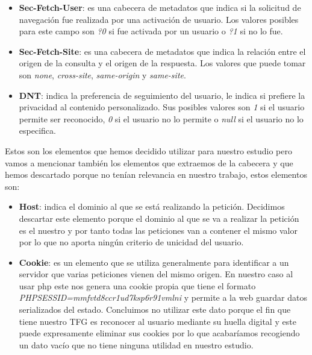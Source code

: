 \begin{itemize}
    \item \textbf{Sec-Fetch-User}: es una cabecera de metadatos que indica si la solicitud de navegación fue realizada por una activación de usuario. Los valores posibles para este campo son \textit{?0} si fue activada por un usuario o \textit{?1} si no lo fue.
    \item \textbf{Sec-Fetch-Site}: es una cabecera de metadatos que indica la relación entre el origen de la consulta y el origen de la respuesta. Los valores que puede tomar son \textit{none}, \textit{cross-site}, \textit{same-origin} y \textit{same-site}.
    \item \textbf{DNT}: indica la preferencia de seguimiento del usuario, le indica si prefiere la privacidad al contenido personalizado. Sus posibles valores son \textit{1} si el usuario permite ser reconocido, \textit{0} si el usuario no lo permite o \textit{null} si el usuario no lo especifica.
\end{itemize}
Estos son los elementos que hemos decidido utilizar para nuestro estudio pero vamos a mencionar también los elementos que extraemos de la cabecera y que hemos descartado porque no tenían relevancia en nuestro trabajo, estos elementos son:
\begin{itemize}
    \item \textbf{Host}: indica el dominio al que se está realizando la petición. Decidimos descartar este elemento porque el dominio al que se va a realizar la petición es el nuestro y por tanto todas las peticiones van a contener el mismo valor por lo que no aporta ningún criterio de unicidad del usuario.
    \item \textbf{Cookie}: es un elemento que se utiliza generalmente para identificar a un servidor que varias peticiones vienen del mismo origen. En nuestro caso al usar php este nos genera una cookie propia que tiene el formato \textit{PHPSESSID=mmfvtd8ccr1ud7ksp6r91vmlni} y permite a la web guardar datos serializados del estado. Concluimos no utilizar este dato porque el fin que tiene nuestro TFG es reconocer al usuario mediante su huella digital y este puede expresamente eliminar sus cookies por lo que acabaríamos recogiendo un dato vacío que no tiene ninguna utilidad en nuestro estudio.
\end{itemize}

